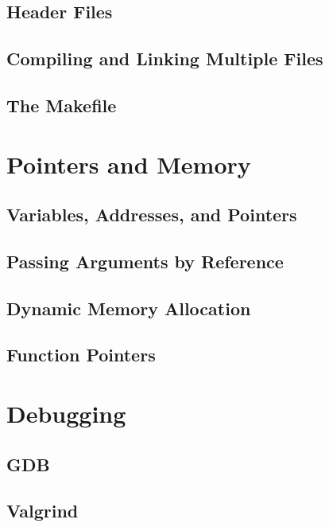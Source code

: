 \documentclass[oneside]{book}
\theoremstyle{definition}
\begin{document}
    \section{Header Files}
    \section{Compiling and Linking Multiple Files}
    \section{The Makefile}

\chapter{Pointers and Memory}
    \section{Variables, Addresses, and Pointers}
    \section{Passing Arguments by Reference}
    \section{Dynamic Memory Allocation}
    \section{Function Pointers}

\chapter{Debugging}
    \section{GDB}
    \section{Valgrind}
\end{document}
